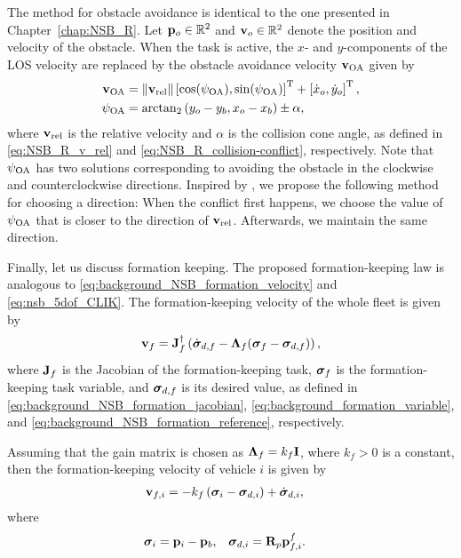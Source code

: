The method for obstacle avoidance is identical to the one presented in Chapter~\ref{chap:NSB_R}.
Let $\mathbf{p}_o \in \mathbb{R}^2$ and $\mathbf{v}_o \in \mathbb{R}^2$ denote the position and velocity of the obstacle.
When the task is active, the $x$- and $y$-components of the LOS velocity are replaced by the obstacle avoidance velocity $\mathbf{v}_{\rm OA}$ given by
\begin{align}
    \mathbf{v}_{\rm OA} &= \left\|\mathbf{v}_{\rm rel}\right\| \left[\cos(\psi_{\rm OA}), \sin(\psi_{\rm OA})\right]^{\mathrm{T}} + \left[\dot{x}_o, \dot{y}_o\right]^{\mathrm{T}}, \\
    \psi_{\rm OA} &= {\rm arctan}_2 \left(y_o - y_b, x_o - x_b\right) \pm \alpha,
\end{align}
where $\mathbf{v}_{\rm rel}$ is the relative velocity and $\alpha$ is the collision cone angle, as defined in \eqref{eq:NSB_R_v_rel} and \eqref{eq:NSB_R_collision-conflict}, respectively.
Note that $\psi_{\rm OA}$ has two solutions corresponding to avoiding the obstacle in the clockwise and counterclockwise directions.
Inspired by \cite{haraldsen_reactive_2021}, we propose the following method for choosing a direction:
When the conflict first happens, we choose the value of $\psi_{\rm OA}$ that is closer to the direction of $\mathbf{v}_{\rm rel}$.
Afterwards, we maintain the same direction.

Finally, let us discuss formation keeping.
The proposed formation-keeping law is analogous to \eqref{eq:background_NSB_formation_velocity} and \eqref{eq:nsb_5dof_CLIK}.
The formation-keeping velocity of the whole fleet is given by
\begin{equation}
    \mathbf{v}_{f} = \mathbf{J}_f^{\dagger} \left(\dot{\bm{\sigma}}_{d,f} - \bm{\Lambda}_f (\bm{\sigma}_f - \bm{\sigma}_{d,f})\right),
\end{equation}
where $\mathbf{J}_f$ is the Jacobian of the formation-keeping task, $\bm{\sigma}_f$ is the formation-keeping task variable, and $\bm{\sigma}_{d,f}$ is its desired value, as defined in \eqref{eq:background_NSB_formation_jacobian}, \eqref{eq:background_formation_variable}, and \eqref{eq:background_NSB_formation_reference}, respectively.

Assuming that the gain matrix is chosen as $\bm{\Lambda}_f = k_f \mathbf{I}$, where $k_f > 0$ is a constant, then the formation-keeping velocity of vehicle $i$ is given by
\begin{align}
    \mathbf{v}_{f, i} &= -k_f \left(\bm{\sigma}_i - \bm{\sigma}_{d,i}\right) + \dot{\bm{\sigma}}_{d,i},
    \label{eq:distr_NSB_v_f_centralized}
\end{align}
where 
\begin{align}
    \bm{\sigma}_{i} &= \mathbf{p}_i - \mathbf{p}_b, &
    \bm{\sigma}_{d,i} &= \mathbf{R}_p \mathbf{p}_{f, i}^f.
\end{align}

